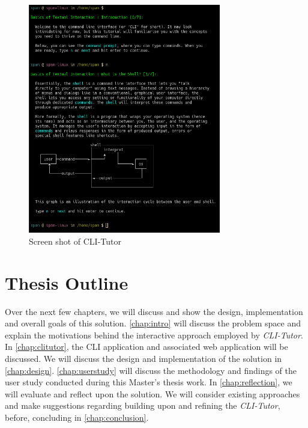 \begin{figure}[H]
	\centering
	\includegraphics[width=0.75\textwidth]{img/clitutor}
	\caption{Screen shot of CLI-Tutor}
	\label{fig:clitutor}
\end{figure}

\section{Thesis Outline}

Over the next few chapters, we will discuss and show the design, implementation
and overall goals of this solution. \autoref{chap:intro} will discuss the
problem space and explain the motivations behind the interactive approach
employed by \textit{CLI-Tutor}. In \autoref{chap:clitutor}, the CLI application
and associated web application will be discussed. We will discuss the design
and implementation of the solution in \autoref{chap:design}.
\autoref{chap:userstudy} will discuss the methodology and findings of the user
study conducted during this Master's thesis work. In \autoref{chap:reflection},
we will evaluate and reflect upon the solution. We will consider existing
approaches and make suggestions regarding building upon and refining the
\textit{CLI-Tutor}, before, concluding in \autoref{chap:conclusion}.

